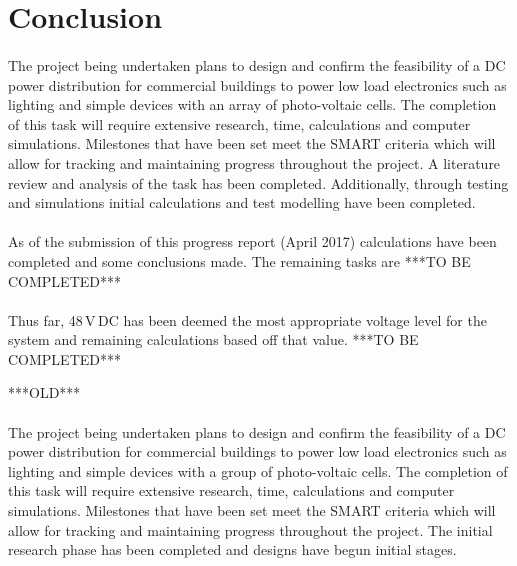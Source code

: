 \section{Conclusion}

\paragraph{}
The project being undertaken plans to design and confirm the feasibility of a DC power distribution for commercial buildings to power low load electronics such as lighting and simple devices with an array of photo-voltaic cells. The completion of this task will require extensive research, time, calculations and computer simulations. Milestones that have been set meet the SMART criteria which will allow for tracking and maintaining progress throughout the project. A literature review and analysis of the task has been completed. Additionally, through testing and simulations initial calculations and test modelling have been completed. 

\paragraph{}
As of the submission of this progress report (April 2017) calculations have been completed and some conclusions made. The remaining tasks are ***TO BE COMPLETED***

\paragraph{}
Thus far, 48\,V\,DC has been deemed the most appropriate voltage level for the system and remaining calculations based off that value. ***TO BE COMPLETED***


***OLD***
\paragraph{}
The project being undertaken plans to design and confirm the feasibility of a DC power distribution for commercial buildings to power low load electronics such as lighting and simple devices with a group of photo-voltaic cells. The completion of this task will require extensive research, time, calculations and computer simulations. Milestones that have been set meet the SMART criteria which will allow for tracking and maintaining progress throughout the project. The initial research phase has been completed and designs have begun initial stages.

